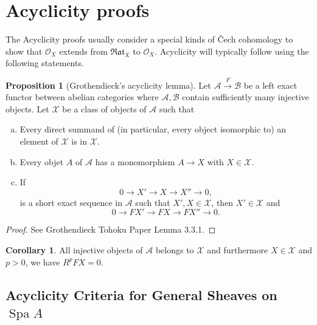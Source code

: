 \documentclass[10pt]{article}
\numberwithin{equation}{section}
\theoremstyle{definition}
\newtheorem*{proposition*}{Proposition}
\newtheorem*{corollary*}{Corollary}
\DeclareMathOperator{\Spa}{Spa}
\newcommand{\Ouv}{\mathscr{O}}
\newcommand{\sA}[0]{\mathscr{A}}
\newcommand{\sX}[0]{\mathscr{X}}
\newcommand{\cO}[0]{\mathcal{O}}
\newcommand{\Rat}[0]{\mathfrak{Rat}}
\begin{document}
\section{Acyclicity proofs}

The Acyclicity proofs usually consider a special kinds of Čech cohomology to show that $\cO_X$ extends from $\Rat_X$ to $\Ouv_X$. Acyclicity will typically follow using the following statements.
\begin{proposition*}[Grothendieck's acyclicity lemma]
    Let $\mathscr{A}\stackrel{F}{\to}\mathscr{B}$ be a left exact functor between abelian categories where $\mathscr{A},\mathscr{B}$ contain sufficiently many injective objects. Let $\mathscr{X}$ be a class of objects of $\mathscr{A}$
    such that
    \begin{enumerate}[a.]
        \item Every direct summand of (in particular, every object isomorphic to) an element of $\mathscr{X}$ is in $\mathscr{X}$.
        \item Every objet $A$ of $\mathscr{A}$ has a monomorphism $A\to X$ with $X\in\mathscr{X}$.
        \item If
        \begin{equation*}
            0\to X'\to X\to X''\to 0,
        \end{equation*}
         is a short exact sequence in $\mathscr{A}$ such that $X',X\in\mathscr{X}$, then $X'\in\mathscr{X}$ and
        \begin{equation*}
            0\to FX'\to FX\to FX''\to 0.
        \end{equation*}
    \end{enumerate}
\end{proposition*}
\begin{proof}
    See Grothendieck Tohoku Paper Lemma 3.3.1.
\end{proof}

\begin{corollary*}
    All injective objects of $\sA$ belongs to $\sX$ and furthermore $X\in\sX$ and $p>0$, we have $R^pFX = 0$.
\end{corollary*}

\subsection{Acyclicity Criteria for General Sheaves on $\Spa A$}
\end{document}

